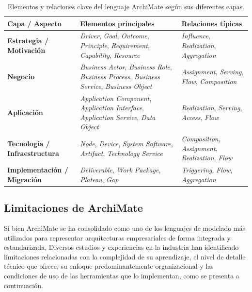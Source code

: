 	\begin{table}[H]
	\centering
	\renewcommand{\arraystretch}{1.3}
	\setlength{\tabcolsep}{8pt}
	\begin{tabular}{@{}p{4cm}p{6cm}p{6cm}@{}}
	\toprule
	\textbf{Capa / Aspecto} & \textbf{Elementos principales} & \textbf{Relaciones típicas} \\ 
	\midrule
	\textbf{Estrategia / Motivación} &
	\textit{Driver}, \textit{Goal}, \textit{Outcome}, \textit{Principle}, \textit{Requirement}, \textit{Capability}, \textit{Resource} &
	\textit{Influence}, \textit{Realization}, \textit{Aggregation} \\ 
	\midrule
	\textbf{Negocio} &
	\textit{Business Actor}, \textit{Business Role}, \textit{Business Process}, \textit{Business Service}, \textit{Business Object} &
	\textit{Assignment}, \textit{Serving}, \textit{Flow}, \textit{Composition} \\ 
	\midrule
	\textbf{Aplicación} &
	\textit{Application Component}, \textit{Application Interface}, \textit{Application Service}, \textit{Data Object} &
	\textit{Realization}, \textit{Serving}, \textit{Access}, \textit{Flow} \\ 
	\midrule
	\textbf{Tecnología / Infraestructura} &
	\textit{Node}, \textit{Device}, \textit{System Software}, \textit{Artifact}, \textit{Technology Service} &
	\textit{Composition}, \textit{Assignment}, \textit{Realization}, \textit{Flow} \\ 
	\midrule
	\textbf{Implementación / Migración} &
	\textit{Deliverable}, \textit{Work Package}, \textit{Plateau}, \textit{Gap} &
	\textit{Triggering}, \textit{Flow}, \textit{Aggregation} \\ 
	\bottomrule
	\end{tabular}
	\caption{Elementos y relaciones clave del lenguaje ArchiMate según sus diferentes capas.}
	\label{table:archimate-elements}
	\end{table}


\subsection{Limitaciones de ArchiMate}
Si bien ArchiMate se ha consolidado como uno de los lenguajes de modelado más utilizados para representar arquitecturas empresariales de forma integrada y estandarizada, Diversos estudios y experiencias en la industria han identificado limitaciones relacionadas con la complejidad de su aprendizaje, el nivel de detalle técnico que ofrece, su enfoque predominantemente organizacional y las condiciones de uso de las herramientas que lo implementan, como se presenta a continuación.

